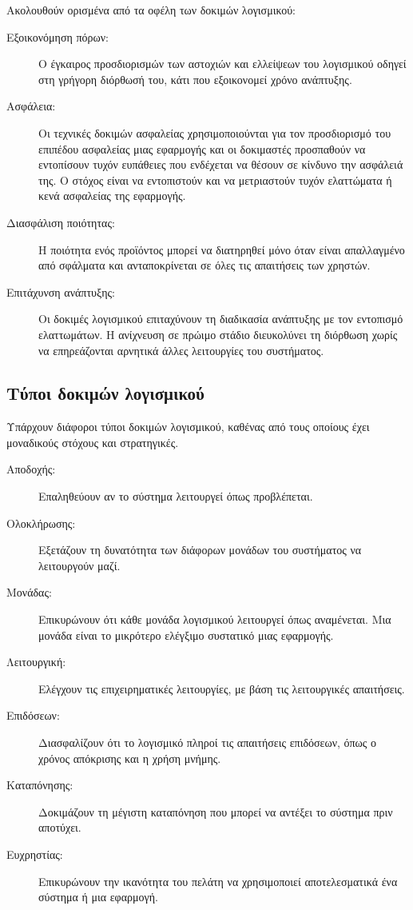 Ακολουθούν ορισμένα από τα οφέλη των δοκιμών λογισμικού:
\begin{description}
	\item[Εξοικονόμηση πόρων:] Ο έγκαιρος προσδιορισμών των αστοχιών και ελλείψεων του λογισμικού οδηγεί στη γρήγορη διόρθωσή του, κάτι που εξοικονομεί χρόνο ανάπτυξης.
	\item[Ασφάλεια:] Οι τεχνικές δοκιμών ασφαλείας χρησιμοποιούνται για τον προσδιορισμό του επιπέδου ασφαλείας μιας εφαρμογής και οι δοκιμαστές προσπαθούν να εντοπίσουν τυχόν ευπάθειες που ενδέχεται να θέσουν σε κίνδυνο την ασφάλειά της. Ο στόχος είναι να εντοπιστούν και να μετριαστούν τυχόν ελαττώματα ή κενά ασφαλείας της εφαρμογής.
	\item[Διασφάλιση ποιότητας:] Η ποιότητα ενός προϊόντος μπορεί να διατηρηθεί μόνο όταν είναι απαλλαγμένο από σφάλματα και ανταποκρίνεται σε όλες τις απαιτήσεις των χρηστών.
	\item[Επιτάχυνση ανάπτυξης:] Οι δοκιμές λογισμικού επιταχύνουν τη διαδικασία ανάπτυξης με τον εντοπισμό ελαττωμάτων. Η ανίχνευση σε πρώιμο στάδιο διευκολύνει τη διόρθωση χωρίς να επηρεάζονται αρνητικά άλλες λειτουργίες του συστήματος.
\end{description}

\subsection{Τύποι δοκιμών λογισμικού}

Υπάρχουν διάφοροι τύποι δοκιμών λογισμικού, καθένας από τους οποίους έχει μοναδικούς στόχους και στρατηγικές.

\begin{description}
	\item[Αποδοχής:] Επαληθεύουν αν το σύστημα λειτουργεί όπως προβλέπεται.
	\item[Ολοκλήρωσης:] Εξετάζουν τη δυνατότητα των διάφορων μονάδων του συστήματος να λειτουργούν μαζί.
	\item[Μονάδας:] Επικυρώνουν ότι κάθε μονάδα λογισμικού λειτουργεί όπως αναμένεται. Μια μονάδα είναι το μικρότερο ελέγξιμο συστατικό μιας εφαρμογής.
	\item[Λειτουργική:] Ελέγχουν τις επιχειρηματικές λειτουργίες, με βάση τις λειτουργικές απαιτήσεις.
	\item[Επιδόσεων:] Διασφαλίζουν ότι το λογισμικό πληροί τις απαιτήσεις επιδόσεων, όπως ο χρόνος απόκρισης και η χρήση μνήμης.
	\item[Καταπόνησης:] Δοκιμάζουν τη μέγιστη καταπόνηση που μπορεί να αντέξει το σύστημα πριν αποτύχει.
	\item[Ευχρηστίας:] Επικυρώνουν την ικανότητα του πελάτη να χρησιμοποιεί αποτελεσματικά ένα σύστημα ή μια εφαρμογή.
\end{description}

